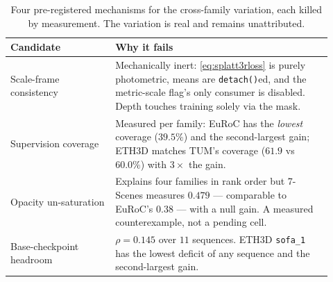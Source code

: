 \begin{table}[t]
\centering\small
\setlength{\tabcolsep}{3pt}
\begin{tabular}{@{}p{0.30\linewidth}p{0.62\linewidth}@{}}
\toprule
Candidate & Why it fails \\
\midrule
Scale-frame consistency &
Mechanically inert: \cref{eq:splatt3rloss} is purely photometric, means are
\texttt{detach()}ed, and the metric-scale flag's only consumer is disabled.
Depth touches training solely via the mask. \\
Supervision coverage &
Measured per family: EuRoC has the \emph{lowest} coverage ($39.5\%$) and the
second-largest gain; ETH3D matches TUM's coverage ($61.9$ vs $60.0\%$) with
$3\times$ the gain. \\
Opacity un-saturation &
Explains four families in rank order but 7-Scenes measures $0.479$ ---
comparable to EuRoC's $0.38$ --- with a null gain. A measured counterexample,
not a pending cell. \\
Base-checkpoint headroom &
$\rho=0.145$ over $11$ sequences. ETH3D \texttt{sofa\_1} has the lowest
deficit of any sequence and the second-largest gain. \\
\bottomrule
\end{tabular}
\caption[Four falsified attributions]{Four pre-registered mechanisms for the cross-family variation, each
killed by measurement. The variation is real and remains unattributed.}
\label{tab:falsified}
\end{table}
